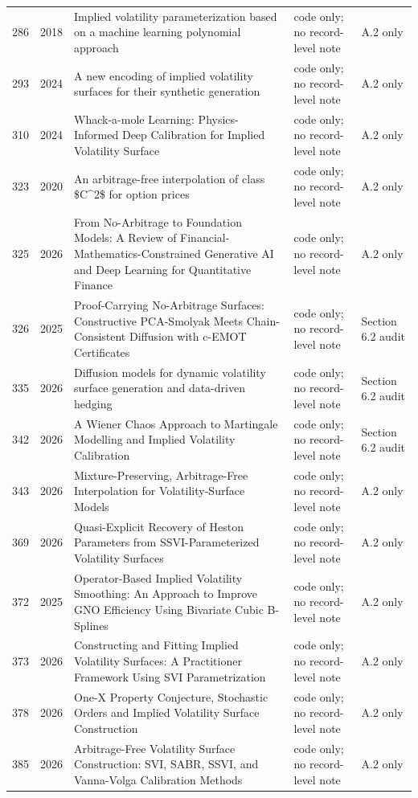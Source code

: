 \documentclass[11pt]{article}
\begin{document}
\begin{longtable}{@{}p{}p{}p{}p{}p{}@{}}
286 & 2018 & Implied volatility parameterization based on a machine learning polynomial approach & code only; no record-level note & A.2 only \\
293 & 2024 & A new encoding of implied volatility surfaces for their synthetic generation & code only; no record-level note & A.2 only \\
310 & 2024 & Whack-a-mole Learning: Physics- Informed Deep Calibration for Implied Volatility Surface & code only; no record-level note & A.2 only \\
323 & 2020 & An arbitrage-free interpolation of class \$C\textasciicircum{}2\$ for option prices & code only; no record-level note & A.2 only \\
325 & 2026 & From No-Arbitrage to Foundation Models: A Review of Financial-Mathematics-Constrained Generative AI and Deep Learning for Quantitative Finance & code only; no record-level note & A.2 only \\
326 & 2025 & Proof-Carrying No-Arbitrage Surfaces: Constructive PCA-Smolyak Meets Chain-Consistent Diffusion with c-EMOT Certificates & code only; no record-level note & Section 6.2 audit \\
335 & 2026 & Diffusion models for dynamic volatility surface generation and data-driven hedging & code only; no record-level note & Section 6.2 audit \\
342 & 2026 & A Wiener Chaos Approach to Martingale Modelling and Implied Volatility Calibration & code only; no record-level note & Section 6.2 audit \\
343 & 2026 & Mixture-Preserving, Arbitrage-Free Interpolation for Volatility-Surface Models & code only; no record-level note & A.2 only \\
369 & 2026 & Quasi-Explicit Recovery of Heston Parameters from SSVI-Parameterized Volatility Surfaces & code only; no record-level note & A.2 only \\
372 & 2025 & Operator-Based Implied Volatility Smoothing: An Approach to Improve GNO Efficiency Using Bivariate Cubic B-Splines & code only; no record-level note & A.2 only \\
373 & 2026 & Constructing and Fitting Implied Volatility Surfaces: A Practitioner Framework Using SVI Parametrization & code only; no record-level note & A.2 only \\
378 & 2026 & One-X Property Conjecture, Stochastic Orders and Implied Volatility Surface Construction & code only; no record-level note & A.2 only \\
385 & 2026 & Arbitrage-Free Volatility Surface Construction: SVI, SABR, SSVI, and Vanna-Volga Calibration Methods & code only; no record-level note & A.2 only \\

\end{longtable}
\end{document}
